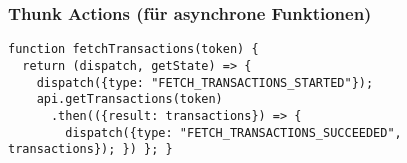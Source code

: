\subsubsection{Thunk Actions (für asynchrone Funktionen)}
\begin{lstlisting}[style=htmlcssjs]
function fetchTransactions(token) {
  return (dispatch, getState) => {
    dispatch({type: "FETCH_TRANSACTIONS_STARTED"});
    api.getTransactions(token)
      .then(({result: transactions}) => {
        dispatch({type: "FETCH_TRANSACTIONS_SUCCEEDED", transactions}); }) }; }
\end{lstlisting}